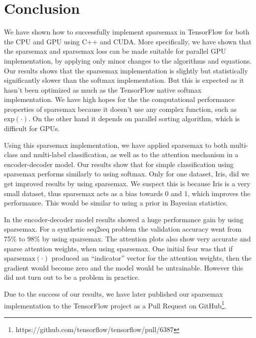 \section{Conclusion}

We have shown how to successfully implement sparsemax in TensorFlow for both the CPU and GPU using C++ and CUDA. More specifically, we have shown that the sparsemax and sparsemax loss can be made suitable for parallel GPU implementation, by applying only minor changes to the algorithms and equations. Our results shows that the sparsemax implementation is slightly but statistically significantly slower than the softmax implementation. But this is expected as it hasn't been optimized as much as the TensorFlow native softmax implementation. We have high hopes for the the computational performance properties of sparsemax because it doesn't use any complex function, such as $\mathrm{exp}(\cdot)$. On the other hand it depends on parallel sorting algorithm, which is difficult for GPUs.

Using this sparsemax implementation, we have applied sparsemax to both multi-class and multi-label classification, as well as to the attention mechanism in a encoder-decoder model. Our results show that for simple classification using sparsemax performs similarly to using softmax. Only for one dataset, Iris, did we get improved results by using sparsemax. We suspect this is because Iris is a very small dataset, thus sparsemax acts as a bias towards 0 and 1, which improves the performance. This would be similar to using a prior in Bayesian statistics.

In the encoder-decoder model results showed a huge performance gain by using sparsemax. For a synthetic seq2seq problem the validation accuracy went from 75\% to 98\% by using sparsemax. The attention plots also show very accurate and sparse attention weights, when using sparsemax. One initial fear was that if $\mathrm{sparsemax}(\cdot)$ produced an ``indicator'' vector for the attention weights, then the gradient would become zero and the model would be untrainable. However this did not turn out to be a problem in practice.

Due to the success of our results, we have later published our sparsemax implementation to the TensorFlow project \cite{tensorflow2015-whitepaper} as a Pull Request on GitHub\footnote{https://github.com/tensorflow/tensorflow/pull/6387}.